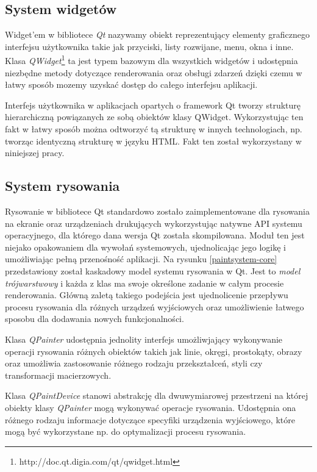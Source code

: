 \documentclass[polish]{inz}
\begin{document}
\subsection{System widgetów}
Widget'em w bibliotece \emph{Qt} nazywamy obiekt reprezentujący elementy graficznego interfejsu użytkownika takie jak przyciski, listy rozwijane, menu, okna i inne. Klasa \emph{QWidget}\footnote{http://doc.qt.digia.com/qt/qwidget.html} ta jest typem bazowym dla wszystkich widgetów i udostępnia niezbędne metody dotyczące renderowania oraz obsługi zdarzeń dzięki czemu w łatwy sposób mozemy uzyskać dostęp do całego interfejsu aplikacji.

Interfejs użytkownika w aplikacjach opartych o framework Qt tworzy strukturę hierarchiczną powiązanych ze sobą obiektów klasy QWidget. Wykorzystując ten fakt w łatwy sposób można odtworzyć tą strukturę w innych technologiach, np. tworząc identyczną strukturę w języku HTML. Fakt ten został wykorzystany w niniejszej pracy.

\subsection{System rysowania}
\label{system_rysowania}
Rysowanie w bibliotece Qt standardowo zostało zaimplementowane dla rysowania na ekranie oraz urządzeniach drukujących wykorzystując natywne API systemu operacyjnego, dla którego dana wersja Qt została skompilowana. Moduł ten jest niejako opakowaniem dla wywołań systemowych, ujednolicając jego logikę i umożliwiając pełną przenośność aplikacji. Na rysunku \ref{paintsystem-core} przedstawiony został kaskadowy model systemu rysowania w Qt. Jest to \emph{model trójwarstwowy} i każda z klas ma swoje określone zadanie w całym procesie renderowania. Główną zaletą takiego podejścia jest ujednolicenie przepływu procesu rysowania dla różnych urządzeń wyjściowych oraz umożliwienie łatwego sposobu dla dodawania nowych funkcjonalności.

Klasa \emph{QPainter} udostępnia jednolity interfejs umożliwjający wykonywanie operacji rysowania różnych obiektów takich jak linie, okręgi, prostokąty, obrazy oraz umożliwia zastosowanie różnego rodzaju przekształceń, styli czy transformacji macierzowych. 

Klasa \emph{QPaintDevice} stanowi abstrakcję dla dwuwymiarowej przestrzeni na której obiekty klasy \emph{QPainter} mogą wykonywać operacje rysowania. Udostępnia ona różnego rodzaju informacje dotyczące specyfiki urządzenia wyjściowego, które mogą być wykorzystane np. do optymalizacji procesu rysowania. 
\end{document}

